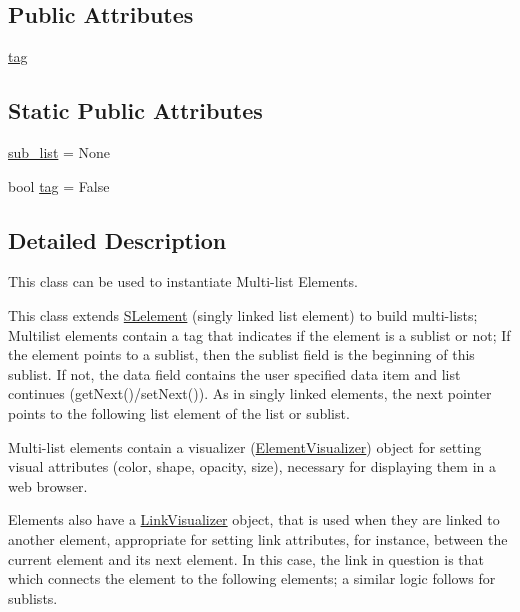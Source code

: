\subsection*{Public Attributes}
\begin{DoxyCompactItemize}
\item 
\mbox{\hyperlink{class_bridges_1_1_m_lelement_1_1_m_lelement_adb11c5e159bc78f59daf34b2ae3c5a58}{tag}}
\end{DoxyCompactItemize}
\subsection*{Static Public Attributes}
\begin{DoxyCompactItemize}
\item 
\mbox{\hyperlink{class_bridges_1_1_m_lelement_1_1_m_lelement_ae79f85968687b3c4c72bd56b836d0976}{sub\+\_\+list}} = None
\item 
bool \mbox{\hyperlink{class_bridges_1_1_m_lelement_1_1_m_lelement_ab10db82c80844494948664c11d5ba810}{tag}} = False
\end{DoxyCompactItemize}


\subsection{Detailed Description}
This class can be used to instantiate Multi-\/list Elements. 

This class extends \mbox{\hyperlink{namespace_bridges_1_1_s_lelement}{S\+Lelement}} (singly linked list element) to build multi-\/lists; Multilist elements contain a tag that indicates if the element is a sublist or not; If the element points to a sublist, then the sublist field is the beginning of this sublist. If not, the data field contains the user specified data item and list continues (get\+Next()/set\+Next()). As in singly linked elements, the next pointer points to the following list element of the list or sublist.

Multi-\/list elements contain a visualizer (\mbox{\hyperlink{namespace_bridges_1_1_element_visualizer}{Element\+Visualizer}}) object for setting visual attributes (color, shape, opacity, size), necessary for displaying them in a web browser.

Elements also have a \mbox{\hyperlink{namespace_bridges_1_1_link_visualizer}{Link\+Visualizer}} object, that is used when they are linked to another element, appropriate for setting link attributes, for instance, between the current element and its next element. In this case, the link in question is that which connects the element to the following elements; a similar logic follows for sublists.


